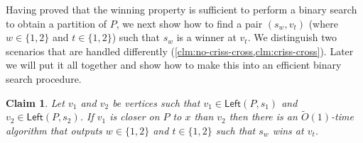 \documentclass{article}
\newcommand{\Left}{\mathsf{Left}}
\newtheorem{claim}{Claim}
\newcommand{\Otild}{\tilde{O}}
\begin{document}
Having proved that the winning property  is sufficient to perform a binary search to obtain a partition of $P$, we next show how to find a pair $(s_w,v_t)$ (where $w\in\{1,2\}$ and $t\in\{1,2\}$) such that $s_w$ is a winner at $v_t$.
We distinguish two scenarios that are handled differently (\cref{clm:no-criss-cross,clm:criss-cross}).
Later we will put it all together and show how to make this into an efficient binary search procedure.

    \begin{claim}\label{clm:no-criss-cross}
        Let $v_1$ and $v_2$ be  vertices such that $v_1\in\Left(P,s_1)$ and $v_2\in\Left(P,s_2)$.
        If $v_1$ is closer on $P$ to $x$ than $v_2$ then there is an $\Otild(1)$-time algorithm that outputs $w\in\{1,2\}$ and $t\in\{1,2\}$ such that $s_w$ wins at $v_t$.
    \end{claim}
\end{document}
